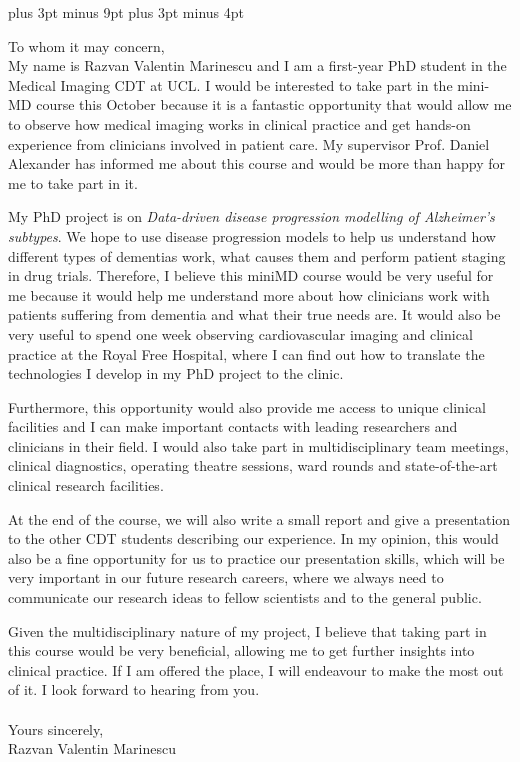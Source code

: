 \documentclass[12pt,a4paper,oneside]{report}
\begin{document}
\belowdisplayskip=12pt plus 3pt minus 9pt
\belowdisplayshortskip=7pt plus 3pt minus 4pt


To whom it may concern,\\

My name is Razvan Valentin Marinescu and I am a first-year PhD student in the Medical Imaging CDT at UCL. I would be interested to take part in the mini-MD course this October because it is a fantastic opportunity that would allow me to observe how medical imaging works in clinical practice and get hands-on experience from clinicians involved in patient care. My supervisor Prof. Daniel Alexander has informed me about this course and would be more than happy for me to take part in it.

My PhD project is on \emph{Data-driven disease progression modelling of Alzheimer's subtypes}. We hope to use disease progression models to help us understand how different types of dementias work, what causes them and perform patient staging in drug trials. Therefore, I believe this miniMD course would be very useful for me because it would help me understand more about how clinicians work with patients suffering from dementia and what their true needs are. It would also be very useful to spend one week observing cardiovascular imaging and clinical practice at the Royal Free Hospital, where I can find out how to translate the technologies I develop in my PhD project to the clinic.

Furthermore, this opportunity would also provide me access to unique clinical facilities and I can make important contacts with leading researchers and clinicians in their field. I would also take part in multidisciplinary team meetings, clinical diagnostics, operating theatre sessions, ward rounds and state-of-the-art clinical research facilities. 

At the end of the course, we will also write a small report and give a presentation to the other CDT students describing our experience. In my opinion, this would also be a fine opportunity for us to practice our presentation skills, which will be very important in our future research careers, where we always need to communicate our research ideas to fellow scientists and to the general public. 

Given the multidisciplinary nature of my project, I believe that taking part in this course would be very beneficial, allowing me to get further insights into clinical practice. If I am offered the place, I will endeavour to make the most out of it. I look forward to hearing from you.\\\\

Yours sincerely,\\

Razvan Valentin Marinescu
\end{document}
